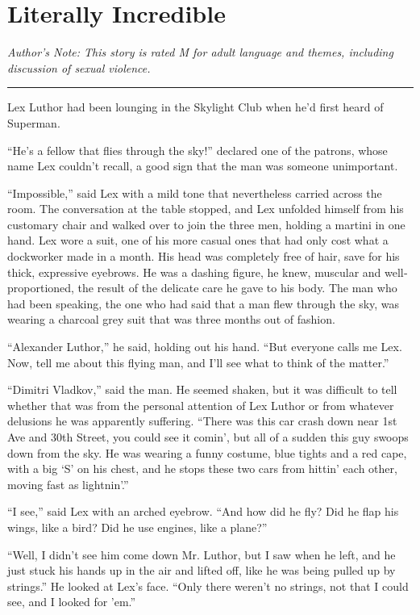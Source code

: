 \chapter{Literally Incredible}\label{literally-incredible}

\emph{Author's Note: This story is rated M for adult language and
themes, including discussion of sexual violence.}

\begin{center}\rule{0.5\linewidth}{\linethickness}\end{center}

Lex Luthor had been lounging in the Skylight Club when he'd first heard
of Superman.

``He's a fellow that flies through the sky!'' declared one of the
patrons, whose name Lex couldn't recall, a good sign that the man was
someone unimportant.

``Impossible,'' said Lex with a mild tone that nevertheless carried
across the room. The conversation at the table stopped, and Lex unfolded
himself from his customary chair and walked over to join the three men,
holding a martini in one hand. Lex wore a suit, one of his more casual
ones that had only cost what a dockworker made in a month. His head was
completely free of hair, save for his thick, expressive eyebrows. He was
a dashing figure, he knew, muscular and well‐proportioned, the result of
the delicate care he gave to his body. The man who had been speaking,
the one who had said that a man flew through the sky, was wearing a
charcoal grey suit that was three months out of fashion.

``Alexander Luthor,'' he said, holding out his hand. ``But everyone
calls me Lex. Now, tell me about this flying man, and I'll see what to
think of the matter.''

``Dimitri Vladkov,'' said the man. He seemed shaken, but it was
difficult to tell whether that was from the personal attention of Lex
Luthor or from whatever delusions he was apparently suffering. ``There
was this car crash down near 1st Ave and 30th Street, you could see it
comin', but all of a sudden this guy swoops down from the sky. He was
wearing a funny costume, blue tights and a red cape, with a big `S' on
his chest, and he stops these two cars from hittin' each other, moving
fast as lightnin'.''

``I see,'' said Lex with an arched eyebrow. ``And how did he fly? Did he
flap his wings, like a bird? Did he use engines, like a plane?''

``Well, I didn't see him come down Mr. Luthor, but I saw when he left,
and he just stuck his hands up in the air and lifted off, like he was
being pulled up by strings.'' He looked at Lex's face. ``Only there
weren't no strings, not that I could see, and I looked for 'em.''

